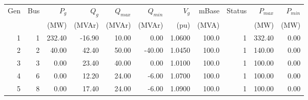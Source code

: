 \begin{tabular}{r r r r r r r r r r r}\toprule
Gen & Bus & {$P_g$} & {$Q_g$} & {$Q_{max}$} & {$Q_{min}$} & {$V_g$} & {mBase} & Status & {$P_{max}$} & {$P_{min}$} \\ 
{} & {} & {(MW)} & {(MVAr)} & {(MVAr)} & {(MVAr)} & {(pu)} & {(MVA)} & {} & {(MW)} & {(MW)} \\ \midrule
1 & 1 & 232.40 & -16.90 & 10.00 & 0.00 & 1.0600 & 100.0 & 1 & 332.40 & 0.00 \\ 
2 & 2 & 40.00 & 42.40 & 50.00 & -40.00 & 1.0450 & 100.0 & 1 & 140.00 & 0.00 \\ 
3 & 3 & 0.00 & 23.40 & 40.00 & 0.00 & 1.0100 & 100.0 & 1 & 100.00 & 0.00 \\ 
4 & 6 & 0.00 & 12.20 & 24.00 & -6.00 & 1.0700 & 100.0 & 1 & 100.00 & 0.00 \\ 
5 & 8 & 0.00 & 17.40 & 24.00 & -6.00 & 1.0900 & 100.0 & 1 & 100.00 & 0.00 \\ 
\bottomrule\end{tabular}
